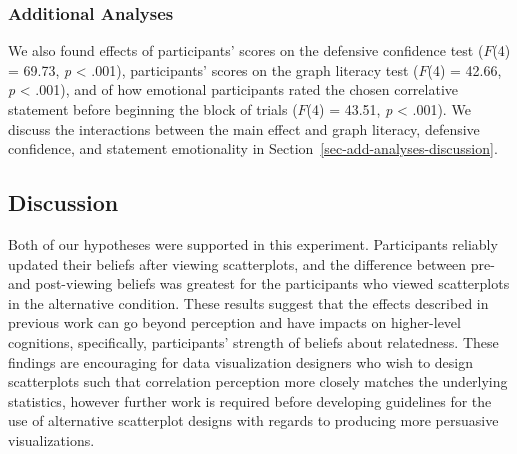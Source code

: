 \documentclass[manuscript,screen,review,anonymous]{acmart}
\begin{document}
\begin{table}

\caption{\label{tbl-condition-interact}Statistics for the significant
main effect of condition on the difference between pre- and post-
scatterplot viewing ratings for standard and alternative plots. Odds
ratios and equivalent Cohen's \emph{d} are also shown.}


\end{table}%

\subsubsection{Additional Analyses}\label{sec-add-analyses}

We also found effects of participants' scores on the defensive
confidence test (\(F\)(4) = 69.73, \emph{p} \textless{} .001),
participants' scores on the graph literacy test (\(F\)(4) = 42.66,
\emph{p} \textless{} .001), and of how emotional participants rated the
chosen correlative statement before beginning the block of trials
(\(F\)(4) = 43.51, \emph{p} \textless{} .001). We discuss the
interactions between the main effect and graph literacy, defensive
confidence, and statement emotionality in
Section~\ref{sec-add-analyses-discussion}.

\subsection{Discussion}\label{sec-main-discussion}

Both of our hypotheses were supported in this experiment. Participants
reliably updated their beliefs after viewing scatterplots, and the
difference between pre- and post-viewing beliefs was greatest for the
participants who viewed scatterplots in the alternative condition. These
results suggest that the effects described in previous work can go
beyond perception and have impacts on higher-level cognitions,
specifically, participants' strength of beliefs about relatedness. These
findings are encouraging for data visualization designers who wish to
design scatterplots such that correlation perception more closely
matches the underlying statistics, however further work is required
before developing guidelines for the use of alternative scatterplot
designs with regards to producing more persuasive visualizations.
\end{document}
